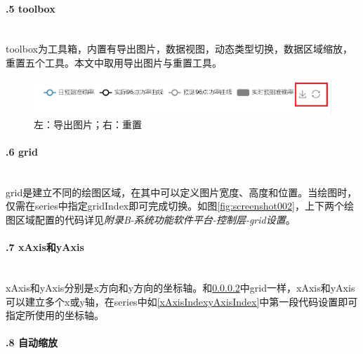 \documentclass[winfonts,UTF8,a4paper]{ctexart}
\begin{document}
\paragraph{\thesubsubsection.5 toolbox}\ \\

toolbox为工具箱，内置有导出图片，数据视图，动态类型切换，数据区域缩放，重置五个工具。本文中取用导出图片与重置工具。
\begin{figure}[H]
	\centering
	\includegraphics[width=0.7\linewidth]{pic/screenshot004}
	\caption{左：导出图片；右：重置}
	\label{fig:screenshot004}
\end{figure}


\paragraph{\thesubsubsection.6 grid}\label{grid}\ \\

grid是建立不同的绘图区域，在其中可以定义图片宽度、高度和位置。当绘图时，仅需在series中指定gridIndex即可完成切换。如图\ref{fig:screenshot002}，上下两个绘图区域配置的代码详见\textit{附录B-系统功能软件平台-控制层-grid设置}。



\paragraph{\thesubsubsection.7 xAxis和yAxis}\ \\

xAxis和yAxis分别是x方向和y方向的坐标轴。和\ref{grid}中grid一样，xAxis和yAxis可以建立多个x或y轴，在series中如\ref{xAxisIndexyAxisIndex}中第一段代码设置即可指定所使用的坐标轴。

\paragraph{\thesubsubsection.8 自动缩放}\ \\
\end{document}
